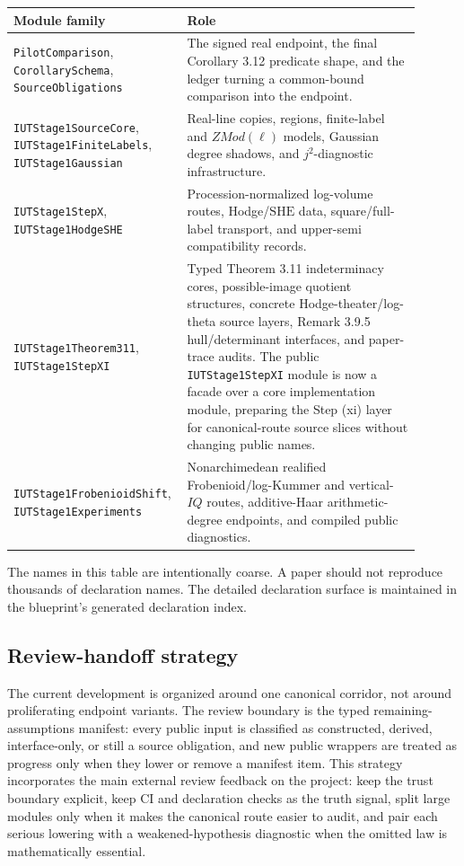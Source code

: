 \documentclass[11pt]{article}
\newcommand{\SHE}{\ensuremath{\mathrm{SHE}}}
\theoremstyle{plain}
\theoremstyle{definition}
\theoremstyle{remark}
\begin{document}
\begin{center}
\begin{tabular}{>{\raggedright\arraybackslash}p{0.34\linewidth}
                >{\raggedright\arraybackslash}p{0.56\linewidth}}
\hline
Module family & Role \\
\hline
\texttt{PilotComparison}, \texttt{CorollarySchema},
\texttt{SourceObligations} &
The signed real endpoint, the final Corollary 3.12 predicate shape, and the
ledger turning a common-bound comparison into the endpoint. \\
\texttt{IUTStage1SourceCore},
\texttt{IUTStage1FiniteLabels}, \texttt{IUTStage1Gaussian} &
Real-line copies, regions, finite-label and \(ZMod(\ell)\) models, Gaussian
degree shadows, and \(j^2\)-diagnostic infrastructure. \\
\texttt{IUTStage1StepX},
\texttt{IUTStage1HodgeSHE} &
Procession-normalized log-volume routes, Hodge/\(\SHE\) data, square/full-label
transport, and upper-semi compatibility records. \\
\texttt{IUTStage1Theorem311},
\texttt{IUTStage1StepXI} &
Typed Theorem 3.11 indeterminacy cores, possible-image quotient structures,
concrete Hodge-theater/log-theta source layers, Remark 3.9.5 hull/determinant
interfaces, and paper-trace audits.  The public \texttt{IUTStage1StepXI}
module is now a facade over a core implementation module, preparing the Step
(xi) layer for canonical-route source slices without changing public names. \\
\texttt{IUTStage1FrobenioidShift},
\texttt{IUTStage1Experiments} &
Nonarchimedean realified Frobenioid/log-Kummer and vertical-\(IQ\) routes,
additive-Haar arithmetic-degree endpoints, and compiled public diagnostics. \\
\hline
\end{tabular}
\end{center}

The names in this table are intentionally coarse.  A paper should not reproduce
thousands of declaration names.  The detailed declaration surface is maintained
in the blueprint's generated declaration index.

\subsection{Review-handoff strategy}

The current development is organized around one canonical corridor, not around
proliferating endpoint variants.  The review boundary is the typed
remaining-assumptions manifest: every public input is classified as constructed,
derived, interface-only, or still a source obligation, and new public wrappers
are treated as progress only when they lower or remove a manifest item.  This
strategy incorporates the main external review feedback on the project: keep
the trust boundary explicit, keep CI and declaration checks as the truth signal,
split large modules only when it makes the canonical route easier to audit, and
pair each serious lowering with a weakened-hypothesis diagnostic when the
omitted law is mathematically essential.
\end{document}
